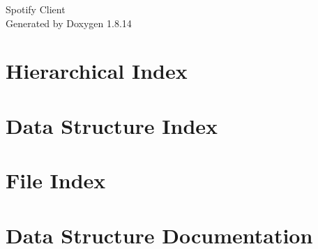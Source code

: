 \documentclass[twoside]{book}
\newcommand{\+}{\discretionary{\mbox{\scriptsize$\hookleftarrow$}}{}{}}
\newcommand{\clearemptydoublepage}{%
  \newpage{\pagestyle{empty}\cleardoublepage}%
}
\begin{document}
\hypersetup{pageanchor=false,
             bookmarksnumbered=true,
             pdfencoding=unicode
            }
\begin{titlepage}
\vspace*{7cm}
\begin{center}%
{\Large Spotify Client }\\
\vspace*{1cm}
{\large Generated by Doxygen 1.8.14}\\
\end{center}
\end{titlepage}
\clearemptydoublepage
{}
\tableofcontents
\clearemptydoublepage
{}
\hypersetup{pageanchor=true}

\chapter{Hierarchical Index}

\chapter{Data Structure Index}

\chapter{File Index}

\chapter{Data Structure Documentation}






























\end{document}
